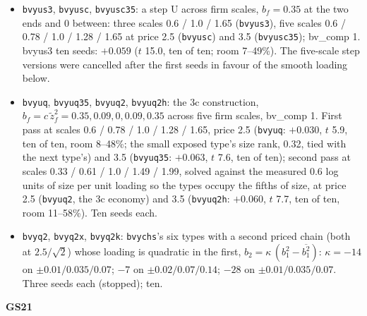 \documentclass[11pt]{article}
\begin{document}
\begin{itemize}
\item \texttt{bvyus3}, \texttt{bvyusc}, \texttt{bvyusc35}: a step U across firm scales, $b_f = 0.35$ at the two ends and 0 between: three scales 0.6 / 1.0 / 1.65 (\texttt{bvyus3}), five scales 0.6 / 0.78 / 1.0 / 1.28 / 1.65 at price 2.5 (\texttt{bvyusc}) and 3.5 (\texttt{bvyusc35}); bv\_comp 1. bvyus3 ten seeds: $+0.059$ ($t$ 15.0, ten of ten; room 7--49\%). The five-scale step versions were cancelled after the first seeds in favour of the smooth loading below.
\item \texttt{bvyuq}, \texttt{bvyuq35}, \texttt{bvyuq2}, \texttt{bvyuq2h}: the 3c construction, $b_f = c\,\tilde z_f^2 = 0.35, 0.09, 0, 0.09, 0.35$ across five firm scales, bv\_comp 1. First pass at scales 0.6 / 0.78 / 1.0 / 1.28 / 1.65, price 2.5 (\texttt{bvyuq}: $+0.030$, $t$ 5.9, ten of ten, room 8--48\%; the small exposed type's size rank, 0.32, tied with the next type's) and 3.5 (\texttt{bvyuq35}: $+0.063$, $t$ 7.6, ten of ten); second pass at scales 0.33 / 0.61 / 1.0 / 1.49 / 1.99, solved against the measured 0.6 log units of size per unit loading so the types occupy the fifths of size, at price 2.5 (\texttt{bvyuq2}, the 3c economy) and 3.5 (\texttt{bvyuq2h}: $+0.060$, $t$ 7.7, ten of ten, room 11--58\%). Ten seeds each.
\item \texttt{bvyq2}, \texttt{bvyq2x}, \texttt{bvyq2k}: \texttt{bvychs}'s six types with a second priced chain (both at $2.5/\sqrt2$) whose loading is quadratic in the first, $b_2=\kappa\,(b_1^2-\overline{b_1^2})$: $\kappa=-14$ on $\pm0.01/0.035/0.07$; $-7$ on $\pm0.02/0.07/0.14$; $-28$ on $\pm0.01/0.035/0.07$. Three seeds each (stopped); ten.
\end{itemize}
\noindent\textbf{GS21}
\end{document}
